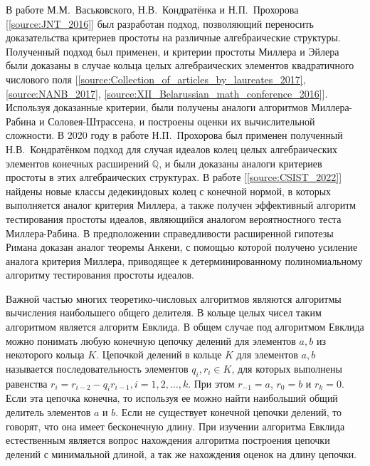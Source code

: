 \documentclass[_00_dissertation.tex]{subfiles}
\begin{document}
В работе М.М.~Васьковского, Н.В.~Кондратёнка и Н.П.~Прохорова [\ref{source:JNT_2016}] был разработан подход, позволяющий переносить доказательства критериев простоты на различные алгебраические структуры.
Полученный подход был применен, и критерии простоты Миллера и Эйлера были доказаны в случае кольца целых алгебраических элементов квадратичного числового поля [\ref{source:Collection_of_articles_by_laureates_2017}, \ref{source:NANB_2017}, \ref{source:XII_Belarussian_math_conference_2016}].
Используя доказанные критерии, были получены аналоги алгоритмов Миллера-Рабина и Соловея-Штрассена, и построены оценки их вычислительной сложности.
В 2020 году в работе Н.П.~Прохорова \cite{source:Prochorov} был применен полученный Н.В.~Кондратёнком подход для случая идеалов колец целых алгебраических элементов конечных расширений $\mathbb{Q}$, и были доказаны аналоги критериев простоты в этих алгебраических структурах.
В работе [\ref{source:CSIST_2022}] найдены новые классы дедекиндовых колец с конечной нормой, в которых выполняется аналог критерия Миллера, а также получен эффективный алгоритм тестирования простоты идеалов, являющийся аналогом вероятностного теста Миллера-Рабина.
В предположении справедливости расширенной гипотезы Римана доказан аналог теоремы Анкени, с помощью которой получено усиление аналога критерия Миллера, приводящее к детерминированному полиномиальному алгоритму тестирования простоты идеалов.


Важной частью многих теоретико-числовых алгоритмов являются алгоритмы вычисления наибольшего общего делителя.
В кольце целых чисел таким алгоритмом является алгоритм Евклида.
В общем случае под алгоритмом Евклида можно понимать любую конечную цепочку делений для элементов $a, b$ из некоторого кольца $K$.
Цепочкой делений в кольце $K$ для элементов $a, b$ называется последовательность элементов $q_i, r_i \in K$, для которых выполнены равенства $r_i=r_{i-2}-q_i r_{i-1}, i = 1, 2, \ldots, k$.
При этом $r_{-1} = a$, $r_0 = b$ и $r_k=0$.
Если эта цепочка конечна, то используя ее можно найти наибольший общий делитель элементов $a$ и $b$.
Если не существует конечной цепочки делений, то говорят, что она имеет бесконечную длину.
При изучении алгоритма Евклида естественным является вопрос нахождения алгоритма построения цепочки делений с минимальной длиной, а так же нахождения оценок на длину цепочки.
\end{document}
